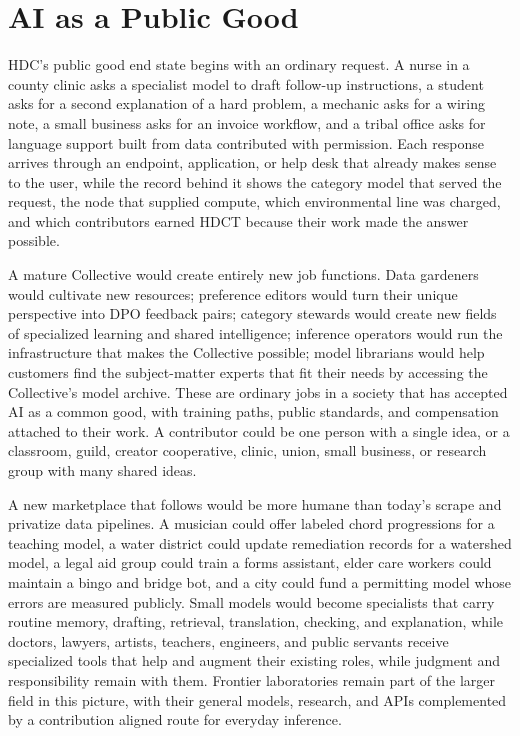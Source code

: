 \documentclass[10pt,a4paper,twocolumn]{article}
\begin{document}
\section{AI as a Public Good}
\label{sec:public-good}

HDC's public good end state begins with an ordinary request. A nurse in a county clinic asks a specialist model to draft follow-up instructions, a student asks for a second explanation of a hard problem, a mechanic asks for a wiring note, a small business asks for an invoice workflow, and a tribal office asks for language support built from data contributed with permission. Each response arrives through an endpoint, application, or help desk that already makes sense to the user, while the record behind it shows the category model that served the request, the node that supplied compute, which environmental line was charged, and which contributors earned HDCT because their work made the answer possible.

A mature Collective would create entirely new job functions. Data gardeners would cultivate new resources; preference editors would turn their unique perspective into DPO feedback pairs; category stewards would create new fields of specialized learning and shared intelligence; inference operators would run the infrastructure that makes the Collective possible; model librarians would help customers find the subject-matter experts that fit their needs by accessing the Collective's model archive. These are ordinary jobs in a society that has accepted AI as a common good, with training paths, public standards, and compensation attached to their work. A contributor could be one person with a single idea, or a classroom, guild, creator cooperative, clinic, union, small business, or research group with many shared ideas.

A new marketplace that follows would be more humane than today's scrape and privatize data pipelines. A musician could offer labeled chord progressions for a teaching model, a water district could update remediation records for a watershed model, a legal aid group could train a forms assistant, elder care workers could maintain a bingo and bridge bot, and a city could fund a permitting model whose errors are measured publicly. Small models would become specialists that carry routine memory, drafting, retrieval, translation, checking, and explanation, while doctors, lawyers, artists, teachers, engineers, and public servants receive specialized tools that help and augment their existing roles, while judgment and responsibility remain with them. Frontier laboratories remain part of the larger field in this picture, with their general models, research, and APIs complemented by a contribution aligned route for everyday inference.
\end{document}

